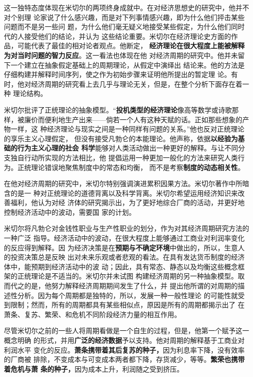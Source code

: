 这一独特态度体现在米切尔的两项终身成就中。在对经济思想史的研究中，他并不对个别理
论家说了什么感兴趣，而是对下列事情感兴趣，即为什么他们抨击某些问题而不是另一些问
题，为什么他们毫无疑义地接受某些假定，为什么他们同时代的人接受他们的结论，并认为
这些结论重要。米切尔在经济理论史方面的作品，可能代表了最佳的相对论者观点。他断定，
\textbf{经济理论在很大程度上能被解释为对当时问题的智力反应}。这一看法也体现在他
对经济周期的研究中。他并未留下一个建立在抽象假定基础上的周期理论，从假定中演绎出
结论来。他的方法是仔细构建并解释时间序列，使之作为初始步骤来证明他所提出的暂定理
论。有时，他对经济周期的研究看上去几乎与理论无关，但是，在整个分析下面存在着一种
理论结构。

米切尔批评了正统理论的抽象模型。“\textbf{投机类型的经济理论}像高等数学或诗歌那
样，被廉价而便利地生产出来——倘若一个人有这种天赋的话。正如那些想象的产物一样，这
种经济理论与现实之间是一种同样有问题的关系。”他也反对正统理论的享乐主义心理假定，
但没有接受凡勃仑的本能理论。他声称，依据\textbf{以经验为基础的行为主义心理的社会
科学}能够对人类活动做出一种更好的解释。与让不同分支独自行动所实现的方法相比，他
提倡运用一种更加一般化的方法来研究人类行为。正统理论错误地聚焦制度中的常态和均衡，
而不是考察\textbf{制度的动态相关性}。

在他对经济周期的研究中，米切尔特别强调演进累积因果方法。米切尔著作中所暗含的是一
种对正统理论的道德背离以及科学背离。米切尔希望运用经济知识来改善福利，他认为对经
济体的研究揭示出，为了更好地综合厂商的活动，并更好地控制经济活动中的波动，需要国
家的计划。

米切尔将凡勃仑对金钱性职业与生产性职业的划分，作为对其经济周期研究方法的一种广泛
指导。经济活动中的波动，在很大程度上能够通过工商业对利润率变化的反应得到解释。因
为经济决策是在\textbf{预期与不确定环境}中做出的，所以，生意人的投资决策总是反映
出对未来乐观或者悲观的看法。在具有发达货币制度的经济体中，能预期到经济活动中的波
动；因此，具有常态、静态以及均衡这些概念框架的正统理论是不适当的。米切尔并未试图
构建经济周期的另一种抽象模型。取而代之的是，他努力解释经济周期期间发生了什么，并
提出他所谓的对周期的描述性分析。因为每个周期都是独特的，所以，发展一种一般性理论
的可能性就受到限制；然而，所有的周期都具有某些相似点，原因是所有的周期都揭示出了
在萧条、复苏、繁荣、和危机不同阶段经济力量的相互作用。

尽管米切尔之前的一些人将周期看做是一个自生的过程，但是，他第一个赋予这一概念明确
的形式，并用\textbf{广泛的经济数据}予以支持。他对周期的解释基于工商业对利润水平
变化的反应。\textbf{萧条携带着其后复苏的种子，}因为利息率下降，没有效率的厂商被
排除，不变成本与可变成本两者都下降，存货减少，等等。\textbf{繁荣也携带着危机与萧
条的种子，}因为成本上升，利润随之受到挤压。

